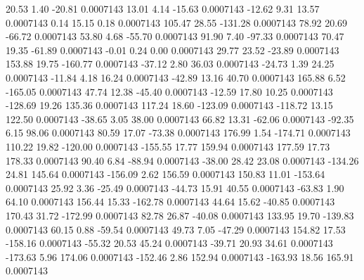        20.53        1.40      -20.81     0.0007143
       13.01        4.14      -15.63     0.0007143
      -12.62        9.31       13.57     0.0007143
        0.14       15.15        0.18     0.0007143
      105.47       28.55     -131.28     0.0007143
       78.92       20.69      -66.72     0.0007143
       53.80        4.68      -55.70     0.0007143
       91.90        7.40      -97.33     0.0007143
       70.47       19.35      -61.89     0.0007143
       -0.01        0.24        0.00     0.0007143
       29.77       23.52      -23.89     0.0007143
      153.88       19.75     -160.77     0.0007143
      -37.12        2.80       36.03     0.0007143
      -24.73        1.39       24.25     0.0007143
      -11.84        4.18       16.24     0.0007143
      -42.89       13.16       40.70     0.0007143
      165.88        6.52     -165.05     0.0007143
       47.74       12.38      -45.40     0.0007143
      -12.59       17.80       10.25     0.0007143
     -128.69       19.26      135.36     0.0007143
      117.24       18.60     -123.09     0.0007143
     -118.72       13.15      122.50     0.0007143
      -38.65        3.05       38.00     0.0007143
       66.82       13.31      -62.06     0.0007143
      -92.35        6.15       98.06     0.0007143
       80.59       17.07      -73.38     0.0007143
      176.99        1.54     -174.71     0.0007143
      110.22       19.82     -120.00     0.0007143
     -155.55       17.77      159.94     0.0007143
      177.59       17.73      178.33     0.0007143
       90.40        6.84      -88.94     0.0007143
      -38.00       28.42       23.08     0.0007143
     -134.26       24.81      145.64     0.0007143
     -156.09        2.62      156.59     0.0007143
      150.83       11.01     -153.64     0.0007143
       25.92        3.36      -25.49     0.0007143
      -44.73       15.91       40.55     0.0007143
      -63.83        1.90       64.10     0.0007143
      156.44       15.33     -162.78     0.0007143
       44.64       15.62      -40.85     0.0007143
      170.43       31.72     -172.99     0.0007143
       82.78       26.87      -40.08     0.0007143
      133.95       19.70     -139.83     0.0007143
       60.15        0.88      -59.54     0.0007143
       49.73        7.05      -47.29     0.0007143
      154.82       17.53     -158.16     0.0007143
      -55.32       20.53       45.24     0.0007143
      -39.71       20.93       34.61     0.0007143
     -173.63        5.96      174.06     0.0007143
     -152.46        2.86      152.94     0.0007143
     -163.93       18.56      165.91     0.0007143
